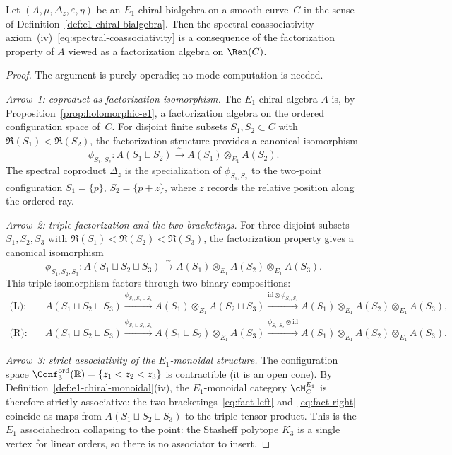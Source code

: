 \begin{proposition}
\label{prop:spectral-coassociativity-factorization}
Let $(A, \mu, \Delta_z, \varepsilon, \eta)$ be an $E_1$-chiral
bialgebra on a smooth curve~$C$ in the sense of
Definition~\textup{\ref{def:e1-chiral-bialgebra}}.
Then the spectral coassociativity
axiom~\textup{(iv)}~\eqref{eq:spectral-coassociativity} is a
consequence of the factorization property of $A$ viewed as a
factorization algebra on $\Ran(C)$.
\end{proposition}

\begin{proof}
The argument is purely operadic; no mode computation is needed.

\emph{Arrow~1: coproduct as factorization isomorphism.}
The $E_1$-chiral algebra $A$ is, by
Proposition~\ref{prop:holomorphic-e1}, a factorization algebra on
the ordered configuration space of~$C$. For disjoint finite
subsets $S_1, S_2 \subset C$ with $\Re(S_1) < \Re(S_2)$, the
factorization structure provides a canonical isomorphism
\[
 \phi_{S_1,S_2} \colon A(S_1 \sqcup S_2)
 \xrightarrow{\;\sim\;} A(S_1) \otimes_{E_1} A(S_2).
\]
The spectral coproduct $\Delta_z$ is the specialization of
$\phi_{S_1,S_2}$ to the two-point configuration
$S_1 = \{p\}$, $S_2 = \{p + z\}$, where $z$ records the
relative position along the ordered ray.

\emph{Arrow~2: triple factorization and the two
bracketings.} For three disjoint subsets $S_1, S_2, S_3$ with
$\Re(S_1) < \Re(S_2) < \Re(S_3)$, the factorization property
gives a canonical isomorphism
\[
 \phi_{S_1,S_2,S_3} \colon A(S_1 \sqcup S_2 \sqcup S_3)
 \xrightarrow{\;\sim\;}
 A(S_1) \otimes_{E_1} A(S_2) \otimes_{E_1} A(S_3).
\]
This triple isomorphism factors through two binary compositions:
\begin{align}
 \text{(L):}\quad
 &A(S_1 \sqcup S_2 \sqcup S_3)
 \xrightarrow{\phi_{S_1, S_2 \sqcup S_3}}
 A(S_1) \otimes_{E_1} A(S_2 \sqcup S_3)
 \xrightarrow{\mathrm{id} \otimes \phi_{S_2,S_3}}
 A(S_1) \otimes_{E_1} A(S_2) \otimes_{E_1} A(S_3),
 \label{eq:fact-left} \\[4pt]
 \text{(R):}\quad
 &A(S_1 \sqcup S_2 \sqcup S_3)
 \xrightarrow{\phi_{S_1 \sqcup S_2, S_3}}
 A(S_1 \sqcup S_2) \otimes_{E_1} A(S_3)
 \xrightarrow{\phi_{S_1,S_2} \otimes \mathrm{id}}
 A(S_1) \otimes_{E_1} A(S_2) \otimes_{E_1} A(S_3).
 \label{eq:fact-right}
\end{align}

\emph{Arrow~3: strict associativity of the $E_1$-monoidal
structure.} The configuration space
$\Conf_3^{\mathrm{ord}}(\mathbb{R}) = \{z_1 < z_2 < z_3\}$ is
contractible (it is an open cone). By
Definition~\ref{def:e1-chiral-monoidal}(iv), the $E_1$-monoidal
category $\cM^{E_1}_C$ is therefore strictly associative: the
two bracketings~\eqref{eq:fact-left} and~\eqref{eq:fact-right}
coincide as maps from $A(S_1 \sqcup S_2 \sqcup S_3)$ to the
triple tensor product. This is the $E_1$ associahedron
collapsing to the point: the Stasheff polytope $K_3$ is a single
vertex for linear orders, so there is no associator to insert.


\end{proof}
